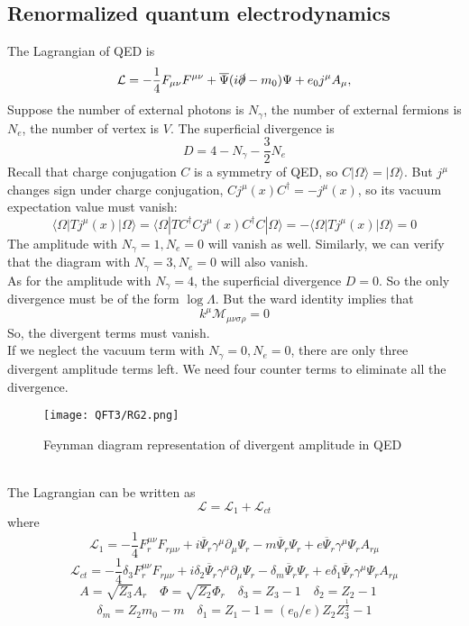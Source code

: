 \subsection{Renormalized quantum electrodynamics}
The Lagrangian of QED is
\[\mathcal{L} = -\frac{1}{4}F_{\mu\nu}F^{\mu\nu} + \overline{\Psi} (i\slashed{\partial}-m_0) \Psi + e_0j^{\mu} A_{\mu}, \]
Suppose the number of external photons is $N_{\gamma}$, the number of external fermions is $N_{e}$, the number of vertex is $V$. The superficial divergence is
\[D = 4 -N_{\gamma} - \frac{3}{2}N_{e}\]
Recall that charge conjugation $C$ is a symmetry of QED, so $C|\Omega\rangle = | \Omega \rangle$. But $j^{\mu}$ changes sign under charge conjugation, $C j^{\mu}(x)C^{\dagger} = - j^{\mu}(x)$, so its vacuum expectation value must vanish:
\[\langle \Omega | T j^{\mu}(x) | \Omega \rangle = \langle \Omega | T C^{\dagger}C j^{\mu}(x)C^{\dagger}C | \Omega \rangle = -\langle \Omega | T j^{\mu}(x) | \Omega \rangle = 0 \]
The amplitude with $N_{\gamma} = 1,N_{e}=0$ will vanish as well. 
Similarly, we can verify that the diagram with $N_{\gamma} = 3,N_e=0$ will also vanish.
\\
As for the amplitude with $N_{\gamma} = 4$, the superficial divergence $D = 0$. So the only divergence must be of the form $\log \Lambda$. But the ward identity implies that
\[k^{\mu}\mathcal{M}_{\mu\nu\sigma\rho} = 0\]
So, the divergent terms must vanish.
\\
If we neglect the vacuum term with $N_{\gamma}=0,N_{e}=0$, there are only three divergent amplitude terms left. We need four counter terms to eliminate all the divergence.
\begin{figure}[!h]
\centering
\texttt{[image: QFT3/RG2.png]}
\caption{Feynman diagram representation of divergent amplitude in QED}
\end{figure}
\\
The Lagrangian can be written as
\[\mathcal{L} = \mathcal{L}_1 + \mathcal{L}_{ct}\]
where
\[\mathcal{L}_1 = -\frac{1}{4}F_r^{\mu\nu}F_{r\mu\nu} +  i\overline{\Psi}_r \gamma^{\mu} \partial_{\mu} \Psi_r - m \overline{\Psi}_r \Psi_r + e \overline{\Psi}_r\gamma^{\mu}\Psi_r A_{r\mu} \]
\[\mathcal{L}_{ct} = -\frac{1}{4}\delta_3 F_r^{\mu\nu}F_{r\mu\nu} + i\delta_{2}\overline{\Psi}_r \gamma^{\mu} \partial_{\mu} \Psi_r - \delta_m \overline{\Psi}_r \Psi_r + e \delta_1 \overline{\Psi}_r\gamma^{\mu}\Psi_r A_{r\mu} \]
\[A = \sqrt{Z_3}A_r \quad \Phi  = \sqrt{Z_2}\Phi_r \quad \delta_{3} = Z_3 - 1 \quad \delta_{2} = Z_2 - 1 \quad \]
\[\delta_m = Z_2 m_0 - m  \quad \delta_1 = Z_1 - 1 =(e_0/e) Z_2 Z_3^{\frac{1}{2}} - 1\]
